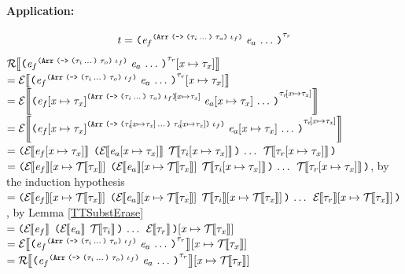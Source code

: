 \begin{sproof}
  \paragraph{Application:}
  \[\term =
  \notedapp[\type_r]{\annotate
    [\typearray{\typefun{\sequence{\type_i}}{\type_o}}{\idx_f}]
    {\expr_f}}{\sequence{\expr_a}}\]
  $\EraseTrm{\typesubst{\notedapp[\type_r]{\annotate
        [\typearray{\typefun{\sequence{\type_i}}{\type_o}}{\idx_f}]
        {\expr_f}}{\sequence{\expr_a}}}}$ \\
  $= \EraseE{\typesubst{\notedapp[\type_r]{\annotate
        [\typearray{\typefun{\sequence{\type_i}}{\type_o}}{\idx_f}]
        {\expr_f}}{\sequence{\expr_a}}}}$ \\
  $= \EraseE{\notedapp[\typesubst{\type_r}]{\annotate
      [\typesubst{\typearray{\typefun{\sequence{\type_i}}{\type_o}}{\idx_f}}]
      {\typesubst{\expr_f}}}{\sequence{\typesubst{\expr_a}}}}$ \\
  $= \EraseE{\notedapp[\typesubst{\type_r}]{\annotate
      [\typearray{\typefun{\sequence{\typesubst{\type_i}}}{\typesubst{\type_o}}}{\idx_f}]
      {\typesubst{\expr_f}}}{\sequence{\typesubst{\expr_a}}}}$ \\
  $= \app{\EraseE{\typesubst{\expr_f}}}{\sequence
    {\ttsexp{\EraseE{\typesubst{\expr_a}}}{\EraseT{\typesubst{\type_i}}}}
    \;\EraseT{\typesubst{\type_r}}}$ \\
  $= \app{\etypesubst{\EraseE{\expr_f}}}{\sequence
    {\ttsexp{\etypesubst{\EraseE{\expr_a}}}{\EraseT{\typesubst{\type_i}}}}
    \;\EraseT{\typesubst{\type_r}}}$, by the induction hypothesis \\
  $= \app{\etypesubst{\EraseE{\expr_f}}}{\sequence
    {\ttsexp{\etypesubst{\EraseE{\expr_a}}}{\etypesubst{\EraseT{\type_i}}}}
    \;\etypesubst{\EraseE{\type_r}}}$, by Lemma \ref{TTSubstErase} \\
  $= \etypesubst{\app{\EraseE{\expr_f}}{\sequence
    {\ttsexp{\EraseE{\expr_a}}{\EraseT{\type_i}}}
    \;\EraseE{\type_r}}}$ \\
  $= \etypesubst{\EraseE{\notedapp[\type_r]{\annotate
        [\typearray{\typefun{\sequence{\type_i}}{\type_o}}{\idx_f}]
        {\expr_f}}{\sequence{\expr_a}}}}$ \\
  $= \etypesubst{\EraseTrm{\notedapp[\type_r]{\annotate
        [\typearray{\typefun{\sequence{\type_i}}{\type_o}}{\idx_f}]
        {\expr_f}}{\sequence{\expr_a}}}}$ \\


\end{sproof}

